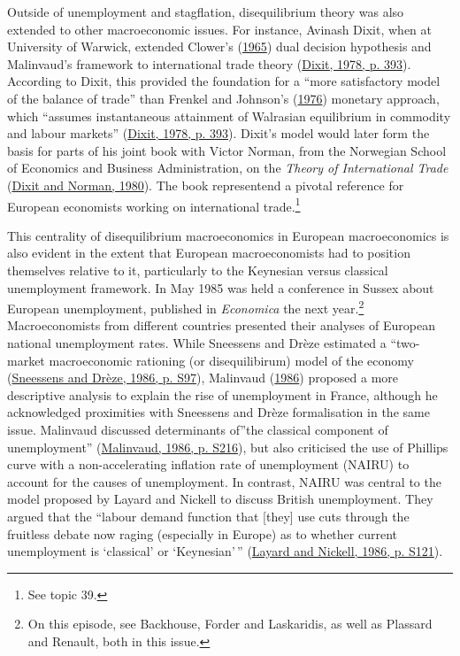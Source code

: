 \documentclass[
  12pt,
  onecolumn]{article}
\begin{document}
Outside of unemployment and stagflation, disequilibrium theory was also
extended to other macroeconomic issues. For instance, Avinash Dixit,
when at University of Warwick, extended Clower's
(\protect\hyperlink{ref-clower1965}{1965}) dual decision hypothesis and
Malinvaud's framework to international trade theory
(\protect\hyperlink{ref-dixit1978}{Dixit, 1978, p. 393}). According to
Dixit, this provided the foundation for a ``more satisfactory model of
the balance of trade'' than Frenkel and Johnson's
(\protect\hyperlink{ref-frenkel1976}{1976}) monetary approach, which
``assumes instantaneous attainment of Walrasian equilibrium in commodity
and labour markets'' (\protect\hyperlink{ref-dixit1978}{Dixit, 1978, p.
393}). Dixit's model would later form the basis for parts of his joint
book with Victor Norman, from the Norwegian School of Economics and
Business Administration, on the \emph{Theory of International Trade}
(\protect\hyperlink{ref-dixit1980}{Dixit and Norman, 1980}). The book
representend a pivotal reference for European economists working on
international trade.\footnote{See topic 39.}

This centrality of disequilibrium macroeconomics in European
macroeconomics is also evident in the extent that European
macroeconomists had to position themselves relative to it, particularly
to the Keynesian versus classical unemployment framework. In May 1985
was held a conference in Sussex about European unemployment, published
in \emph{Economica} the next year.\footnote{On this episode, see
  Backhouse, Forder and Laskaridis, as well as Plassard and Renault,
  both in this issue.} Macroeconomists from different countries
presented their analyses of European national unemployment rates. While
Sneessens and Drèze estimated a ``two-market macroeconomic rationing (or
disequilibirum) model of the economy
(\protect\hyperlink{ref-sneessens1986}{Sneessens and Drèze, 1986, p.
S97}), Malinvaud (\protect\hyperlink{ref-malinvaud1986}{1986}) proposed
a more descriptive analysis to explain the rise of unemployment in
France, although he acknowledged proximities with Sneessens and Drèze
formalisation in the same issue. Malinvaud discussed determinants
of''the classical component of unemployment''
(\protect\hyperlink{ref-malinvaud1986}{Malinvaud, 1986, p. S216}), but
also criticised the use of Phillips curve with a non-accelerating
inflation rate of unemployment (NAIRU) to account for the causes of
unemployment. In contrast, NAIRU was central to the model proposed by
Layard and Nickell to discuss British unemployment. They argued that the
``labour demand function that {[}they{]} use cuts through the fruitless
debate now raging (especially in Europe) as to whether current
unemployment is `classical' or `Keynesian'\,''
(\protect\hyperlink{ref-layard1986}{Layard and Nickell, 1986, p. S121}).
\end{document}
